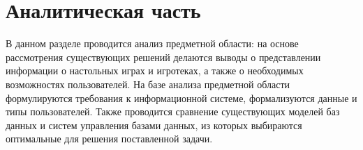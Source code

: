 \chapter{Аналитическая часть}

\begin{comment}
\section{ЧерновЯчок}

На рисунке \ref{img:worm} представлен Червячок (талисман этого курсача) для
повышения настрения при написании данной работы.

\img{5cm}{worm}{Просто червячок, чтобы не было грустно}{worm}

А дальше тут просто черновые записи, а то они сливаются.

\subsection{Про анализ области}

На специализированных сайтах ...

Каждый магазин представляет свои анонсы.

Как правило, анонс игротеки включает: 

Добавим туда ещё и организатора.

Предоставляется возможность регистрации через гугл формы. Необходимость
интеграции --- необходимость введения игрока.

Игротека проводится организатором (магазином) в каком-то месте (кафе, антикафе,
ресторане и тп). На ней представлена одна или несколько игр, в которые можно
поиграть. Часто организаторы предоставляют возможность покупки тех же игр прямо
на месте или возможность сделать заказ.

\textbf{\texttt{Анализ}} страниц сайтах об игротеках показал, что
\textbf{\texttt{обычно}} информация об игротеке включает дату, время начала,
продолжительность или время окончания, адрес проведения и стоимость участия.
Также представляется набор игр, по которым проводится игротека.

Информация об играх 
\end{comment}

В данном разделе проводится анализ предметной области: на основе рассмотрения
существующих решений делаются выводы о представлении информации о настольных
играх и игротеках, а также о необходимых возможностях пользователей. На базе
анализа предметной области формулируются требования к информационной системе,
формализуются данные и типы пользователей. Также проводится сравнение
существующих моделей баз данных и систем управления базами данных, из которых
выбираются оптимальные для решения поставленной задачи.

